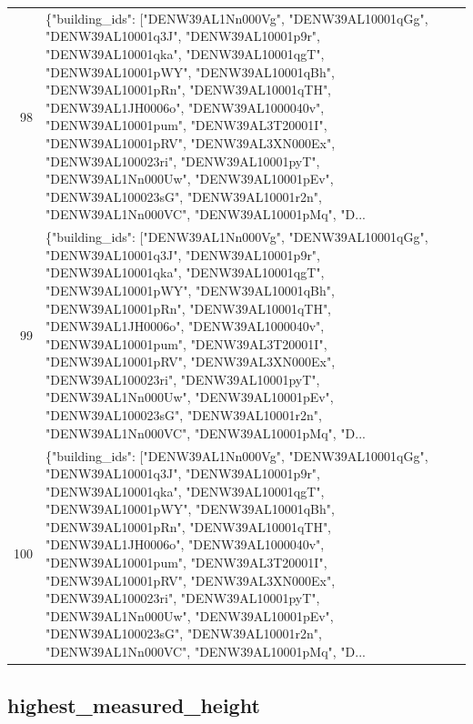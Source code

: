 \documentclass[a4paper,11pt]{article}
\begin{document}
\begin{table}[ht]
\begin{tabular}{r p{12cm}}
98 & \{"building\_ids": ["DENW39AL1Nn000Vg", "DENW39AL10001qGg", "DENW39AL10001q3J", "DENW39AL10001p9r", "DENW39AL10001qka", "DENW39AL10001qgT", "DENW39AL10001pWY", "DENW39AL10001qBh", "DENW39AL10001pRn", "DENW39AL10001qTH", "DENW39AL1JH0006o", "DENW39AL1000040v", "DENW39AL10001pum", "DENW39AL3T20001I", "DENW39AL10001pRV", "DENW39AL3XN000Ex", "DENW39AL100023ri", "DENW39AL10001pyT", "DENW39AL1Nn000Uw", "DENW39AL10001pEv", "DENW39AL100023sG", "DENW39AL10001r2n", "DENW39AL1Nn000VC", "DENW39AL10001pMq", "D... \\
99 & \{"building\_ids": ["DENW39AL1Nn000Vg", "DENW39AL10001qGg", "DENW39AL10001q3J", "DENW39AL10001p9r", "DENW39AL10001qka", "DENW39AL10001qgT", "DENW39AL10001pWY", "DENW39AL10001qBh", "DENW39AL10001pRn", "DENW39AL10001qTH", "DENW39AL1JH0006o", "DENW39AL1000040v", "DENW39AL10001pum", "DENW39AL3T20001I", "DENW39AL10001pRV", "DENW39AL3XN000Ex", "DENW39AL100023ri", "DENW39AL10001pyT", "DENW39AL1Nn000Uw", "DENW39AL10001pEv", "DENW39AL100023sG", "DENW39AL10001r2n", "DENW39AL1Nn000VC", "DENW39AL10001pMq", "D... \\
100 & \{"building\_ids": ["DENW39AL1Nn000Vg", "DENW39AL10001qGg", "DENW39AL10001q3J", "DENW39AL10001p9r", "DENW39AL10001qka", "DENW39AL10001qgT", "DENW39AL10001pWY", "DENW39AL10001qBh", "DENW39AL10001pRn", "DENW39AL10001qTH", "DENW39AL1JH0006o", "DENW39AL1000040v", "DENW39AL10001pum", "DENW39AL3T20001I", "DENW39AL10001pRV", "DENW39AL3XN000Ex", "DENW39AL100023ri", "DENW39AL10001pyT", "DENW39AL1Nn000Uw", "DENW39AL10001pEv", "DENW39AL100023sG", "DENW39AL10001r2n", "DENW39AL1Nn000VC", "DENW39AL10001pMq", "D... \\
\hline
\end{tabular}
\end{table}

\clearpage
\subsection{highest\_measured\_height}
\end{document}
